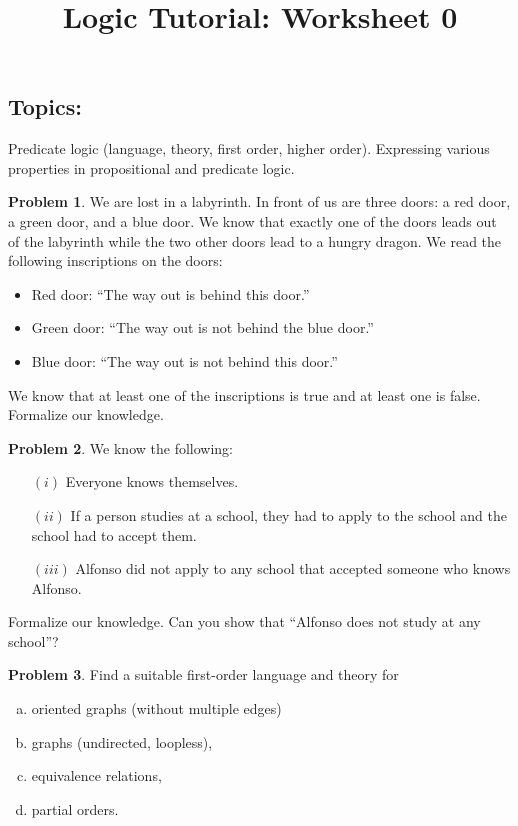 \documentclass{amsart}
\title{\sc Logic Tutorial: Worksheet 0}
\date{}
\theoremstyle{definition}
\newtheorem{problem}{Problem}
\begin{document}
\maketitle


\subsection*{Topics:} Predicate logic (language, theory, first order, higher order). Expressing various properties in propositional and predicate logic.

\smallskip
\begin{problem}
\item We are lost in a labyrinth. In front of us are three doors: a red door, a green door, and a blue door. We know that exactly one of the doors leads out of the labyrinth while the two other doors lead to a hungry dragon. We read the following inscriptions on the doors:
\begin{itemize}
    \item Red door: ``The way out is behind this door.''
    \item Green door: ``The way out is not behind the blue door.''
    \item Blue door: ``The way out is not behind this door.''
\end{itemize}
We know that at least one of the inscriptions is true and at least one is false. Formalize our knowledge.
\end{problem}

\smallskip
\begin{problem} We know the following:
\begin{enumerate}
    \item[$(i)$] Everyone knows themselves.
\item[$(ii)$] If a person studies at a school, they had to apply to the school and the school had to accept them.
\item[$(iii)$] Alfonso did not apply to any school that accepted someone who knows Alfonso.
\end{enumerate}
Formalize our knowledge. Can you show that ``Alfonso does not study at any school''?
\end{problem}




\smallskip
\begin{problem}
Find a suitable first-order language and theory for
\begin{enumerate}[a)]
    \item oriented graphs (without multiple edges)
    \item graphs (undirected, loopless),
    \item equivalence relations,
    \item partial orders.
\end{enumerate}
\end{problem}
\end{document}
